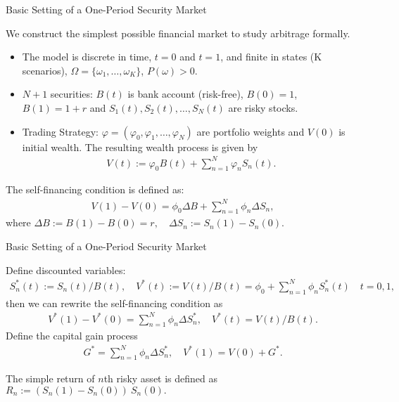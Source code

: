 \documentclass{beamer}
\begin{document}
\begin{frame}{Basic Setting of a One-Period Security Market}

    {\footnotesize \footnotesize
     We construct the simplest possible financial market to study arbitrage formally.
     \begin{itemize}
        \item The model is discrete in time, \( t = 0 \) and \( t = 1 \), and finite in states (K scenarios), 
        \( \Omega = \{\omega_1, \ldots, \omega_K\} \), \( P(\omega) > 0 \).
        \item \( N + 1 \) securities: \( B(t) \) is bank account (risk-free), \( B(0) = 1 \), \( B(1) = 1 + r \) and 
        \( S_1(t), S_2(t), \ldots, S_N(t) \) are risky stocks.
        \item Trading Strategy: \( \varphi = (\varphi_0, \varphi_1, \ldots, \varphi_N) \) are portfolio weights 
        and \( V(0) \) is initial wealth. The resulting wealth process is given by
        \begin{align*}
            V(t) := \varphi_0 B(t) + \sum_{n=1}^N \varphi_n S_n(t) .
        \end{align*}
     \end{itemize}
      \par  \pause The self-financing condition is defined as:
        \begin{align*}
            V(1) - V(0) = \phi_0 \Delta B + \sum_{n=1}^N \phi_n \Delta S_n,
        \end{align*}
        where $\Delta B := B(1) - B(0)=r, \quad \Delta S_n := S_n(1) - S_n(0).$

    }
\end{frame}

\begin{frame}{Basic Setting of a One-Period Security Market}

    {\footnotesize \footnotesize
    Define discounted variables:
    \begin{align*}
        S_n^*(t) := S_n(t)/B(t), \quad V^*(t) := V(t)/B(t) = \phi_0 + \sum_{n=1}^N \phi_n S_n^*(t) \quad t = 0, 1,
    \end{align*}
    then we can rewrite the self-financing condition as
    \begin{align*}
        V^*(1) - V^*(0) = \sum_{n=1}^N \phi_n \Delta S_n^*, \quad V^*(t) = V(t)/B(t).
    \end{align*}
     \pause Define the capital gain process
    \begin{align*}
        G^* = \sum_{n=1}^N \phi_n \Delta S_n^*, \quad  V^*(1) = V(0) + G^*.
    \end{align*}

    \par The simple return of \( n \)th risky asset is defined as $R_n := (S_n(1) - S_n(0))\ S_n(0).$
    }
\end{frame}
\end{document}
